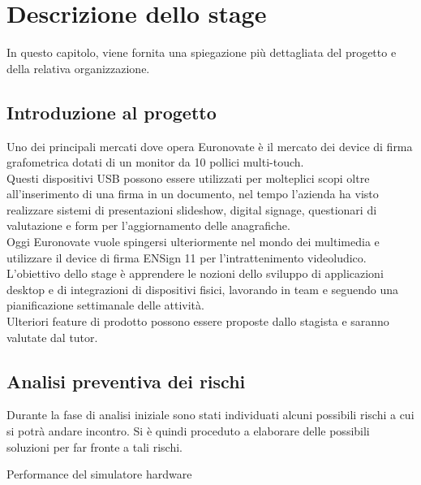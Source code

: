 \chapter{Descrizione dello stage}
\label{cap:descrizione-stage}

In questo capitolo, viene fornita una spiegazione più dettagliata del progetto e della relativa organizzazione.

\section{Introduzione al progetto}

Uno dei principali mercati dove opera Euronovate è il mercato dei device di firma grafometrica
dotati di un monitor da 10 pollici multi-touch.\\ Questi dispositivi USB possono essere utilizzati
per molteplici scopi oltre all'inserimento di una firma in un documento, nel tempo l'azienda ha visto
realizzare sistemi di presentazioni slideshow, digital signage, questionari di valutazione e form
per l'aggiornamento delle anagrafiche.\\ Oggi Euronovate vuole spingersi ulteriormente nel mondo dei
multimedia e utilizzare il device di firma ENSign 11 per l'intrattenimento videoludico.\\
L'obiettivo dello stage è apprendere le nozioni dello sviluppo di applicazioni desktop e di integrazioni di dispositivi fisici, lavorando in team e seguendo una pianificazione
settimanale delle attività.\\ 
Ulteriori feature di prodotto possono essere proposte dallo stagista e saranno valutate dal tutor.

\section{Analisi preventiva dei rischi}

Durante la fase di analisi iniziale sono stati individuati alcuni possibili rischi a cui si potrà andare incontro.
Si è quindi proceduto a elaborare delle possibili soluzioni per far fronte a tali rischi.\\

\begin{risk}{Performance del simulatore hardware}
    \label{risk:hardware-simulator} 
\end{risk}

